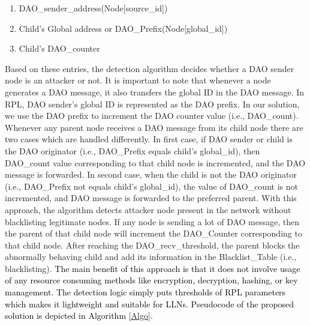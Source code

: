 \documentclass[conference, a4paper]{IEEEtran}
\begin{document}
\begin{enumerate}
    \item DAO\_sender\_address(Node[source\_id])
    \item Child's Global address or DAO\_Prefix(Node[global\_id])
    \item Child's DAO\_counter
\end{enumerate}

Based on these entries, the detection algorithm decides whether a DAO sender node is an attacker or not. It is important to note that whenever a node generates a DAO message, it also transfers the global ID in the DAO message. In RPL, DAO sender's global ID is represented as the DAO prefix. In our solution, we use the DAO prefix to increment the DAO counter value (i.e., DAO\_count). Whenever any parent node receives a DAO message from its child node there are two cases which are handled differently. In first case, if  DAO sender or child is the DAO originator (i.e., DAO\_Prefix equals child's global\_id), then DAO\_count value corresponding to that child node is incremented, and the DAO message is forwarded. In second case, when the child is not the DAO originator (i.e., DAO\_Prefix not equals child's global\_id), the value of DAO\_count is not incremented, and DAO message is forwarded to the preferred parent. With this approach, the algorithm detects attacker node present in the network without blacklisting legitimate nodes. If any node is sending a lot of DAO message, then the parent of that child node will increment the DAO\_Counter corresponding to that child node. After reaching the DAO\_recv\_threshold, the parent blocks the abnormally behaving child and add its information in the Blacklist\_Table (i.e., blacklisting). \textcolor{black}{The main benefit of this approach is that it does not involve usage of any resource consuming methods like encryption, decryption, hashing, or key management. The detection logic simply puts thresholds of RPL parameters which makes it lightweight and suitable for LLNs. Pseudocode of the proposed solution is depicted in Algorithm \ref{Algo}.}
\end{document}

